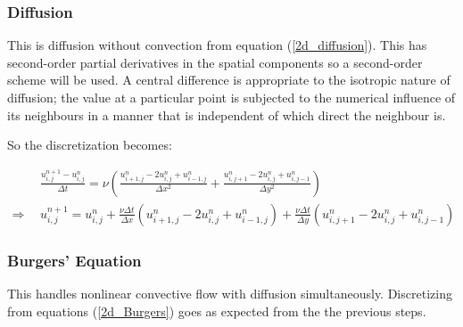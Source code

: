\documentclass[11pt]{article}
\begin{document}
{\subsubsection{Diffusion}
This is diffusion without convection from equation (\ref{2d_diffusion}).
This has second-order partial derivatives in the spatial components so a second-order
scheme will be used. A central difference is appropriate to the isotropic nature of
diffusion; the value at a particular point is subjected to the numerical influence of
its neighbours in a manner that is independent of which direct the neighbour is.


So the discretization becomes:

\begin{align}
&\frac{u^{n+1}_{i,j} - u^{n}_{i,j}}{\Delta t} = \nu
	\left( \frac{u^n_{i+1,j} - 2u^n_{i,j} + u^n_{i-1,j}}{\Delta x^2} \right.
  + \left. \frac{u^n_{i,j+1} - 2u^n_{i,j} + u^n_{i,j-1}}{\Delta y^2} \right)		\\
\Rightarrow~~
&u^{n+1}_{i,j} = u^n_{i,j}
			+ \frac{\nu \Delta t}{\Delta x} (u^n_{i+1,j} - 2u^n_{i,j} + u^n_{i-1,j})
			+ \frac{\nu \Delta t}{\Delta y} (u^n_{i,j+1} - 2u^n_{i,j} + u^n_{i,j-1})
\end{align}

\subsubsection{Burgers' Equation}
This handles nonlinear convective flow with diffusion simultaneously. Discretizing
from equations (\ref{2d_Burgers}) goes as expected from the the previous steps.

}
\end{document}
